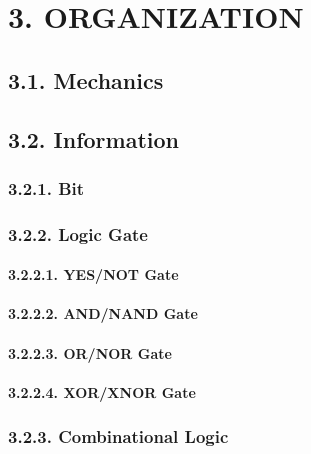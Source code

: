 \documentclass[
]{article}
\begin{document}
\hypertarget{organization}{%
\section{3. ORGANIZATION}\label{organization}}

\hypertarget{mechanics}{%
\subsection{3.1. Mechanics}\label{mechanics}}

\hypertarget{information}{%
\subsection{3.2. Information}\label{information}}

\hypertarget{bit}{%
\subsubsection{3.2.1. Bit}\label{bit}}

\hypertarget{logic-gate}{%
\subsubsection{3.2.2. Logic Gate}\label{logic-gate}}

\hypertarget{yesnot-gate}{%
\paragraph{3.2.2.1. YES/NOT Gate}\label{yesnot-gate}}

\hypertarget{andnand-gate}{%
\paragraph{3.2.2.2. AND/NAND Gate}\label{andnand-gate}}

\hypertarget{ornor-gate}{%
\paragraph{3.2.2.3. OR/NOR Gate}\label{ornor-gate}}

\hypertarget{xorxnor-gate}{%
\paragraph{3.2.2.4. XOR/XNOR Gate}\label{xorxnor-gate}}

\hypertarget{combinational-logic}{%
\subsubsection{3.2.3. Combinational Logic}\label{combinational-logic}}
\end{document}
